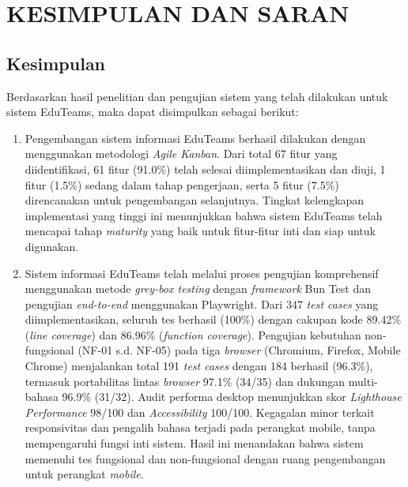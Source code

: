 \chapter{KESIMPULAN DAN SARAN} \label{Bab V}

\section{Kesimpulan} \label{V.Kesimpulan}
Berdasarkan hasil penelitian dan pengujian sistem yang telah dilakukan untuk sistem EduTeams, maka dapat disimpulkan sebagai berikut:
\begin{enumerate}
	\item Pengembangan sistem informasi EduTeams berhasil dilakukan dengan menggunakan metodologi \textit{Agile Kanban}. Dari total 67 fitur yang diidentifikasi, 61 fitur (91.0\%) telah selesai diimplementasikan dan diuji, 1 fitur (1.5\%) sedang dalam tahap pengerjaan, serta 5 fitur (7.5\%) direncanakan untuk pengembangan selanjutnya. Tingkat kelengkapan implementasi yang tinggi ini menunjukkan bahwa sistem EduTeams telah mencapai tahap \textit{maturity} yang baik untuk fitur-fitur inti dan siap untuk digunakan.
	\item Sistem informasi EduTeams telah melalui proses pengujian komprehensif menggunakan metode \textit{grey-box testing} dengan \textit{framework} Bun Test dan pengujian \textit{end-to-end} menggunakan Playwright. Dari 347 \textit{test cases} yang diimplementasikan, seluruh tes berhasil (100\%) dengan cakupan kode 89.42\% (\textit{line coverage}) dan 86.96\% (\textit{function coverage}). Pengujian kebutuhan non-fungsional (NF-01 s.d. NF-05) pada tiga \textit{browser} (Chromium, Firefox, Mobile Chrome) menjalankan total 191 \textit{test cases} dengan 184 berhasil (96.3\%), termasuk portabilitas lintas \textit{browser} 97.1\% (34/35) dan dukungan multi-bahasa 96.9\% (31/32). Audit performa desktop menunjukkan skor \textit{Lighthouse Performance} 98/100 dan \textit{Accessibility} 100/100. Kegagalan minor terkait responsivitas dan pengalih bahasa terjadi pada perangkat mobile, tanpa mempengaruhi fungsi inti sistem. Hasil ini menandakan bahwa sistem memenuhi tes fungsional dan non-fungsional dengan ruang pengembangan untuk perangkat \textit{mobile}.
\end{enumerate}



